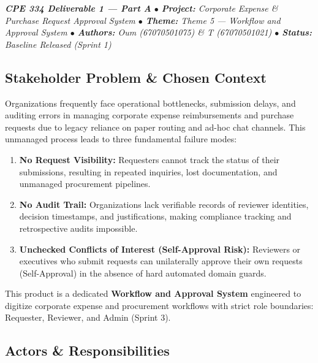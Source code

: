 \documentclass[11pt,a4paper]{article}
\begin{document}
\begin{tcolorbox}[colback=lightbg,colframe=secondary,arc=2mm,boxrule=0.8pt]\small\itshape
\textbf{CPE 334 Deliverable 1 — Part A} \quad $\bullet$ \quad \textbf{Project:} Corporate Expense \& Purchase Request Approval System \quad $\bullet$ \quad \textbf{Theme:} Theme 5 — Workflow and Approval System \quad $\bullet$ \quad \textbf{Authors:} Oum (67070501075) \& T (67070501021) \quad $\bullet$ \quad \textbf{Status:} Baseline Released (Sprint 1)
\end{tcolorbox}


\subsection{Stakeholder Problem \& Chosen Context}

Organizations frequently face operational bottlenecks, submission delays, and auditing errors in managing corporate expense reimbursements and purchase requests due to legacy reliance on paper routing and ad-hoc chat channels. This unmanaged process leads to three fundamental failure modes:\\
\begin{enumerate}[leftmargin=*,itemsep=2pt,topsep=2pt]
  \item \textbf{No Request Visibility:} Requesters cannot track the status of their submissions, resulting in repeated inquiries, lost documentation, and unmanaged procurement pipelines.
  \item \textbf{No Audit Trail:} Organizations lack verifiable records of reviewer identities, decision timestamps, and justifications, making compliance tracking and retrospective audits impossible.
  \item \textbf{Unchecked Conflicts of Interest (Self-Approval Risk):} Reviewers or executives who submit requests can unilaterally approve their own requests (Self-Approval) in the absence of hard automated domain guards.
\end{enumerate}
This product is a dedicated \textbf{Workflow and Approval System} engineered to digitize corporate expense and procurement workflows with strict role boundaries: Requester, Reviewer, and Admin (Sprint 3).\\


\subsection{Actors \& Responsibilities}
\end{document}
